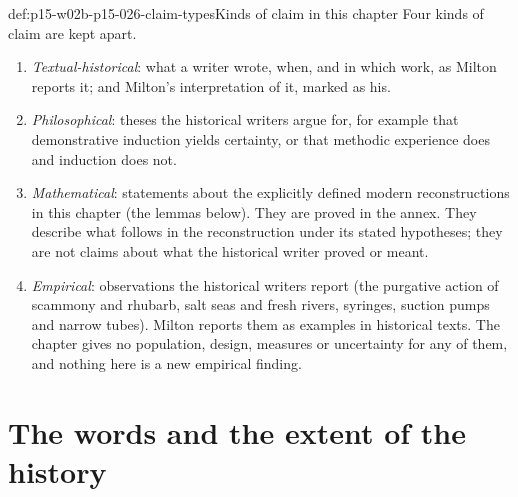 \begin{hbconvention}{def:p15-w02b-p15-026-claim-types}{Kinds of claim in this chapter}
Four kinds of claim are kept apart.
\begin{enumerate}
\item \emph{Textual-historical}: what a writer wrote, when, and in which
  work, as Milton reports it; and Milton's interpretation of it, marked as
  his.
\item \emph{Philosophical}: theses the historical writers argue for, for
  example that demonstrative induction yields certainty, or that methodic
  experience does and induction does not.
\item \emph{Mathematical}: statements about the explicitly defined modern
  reconstructions in this chapter (the lemmas below). They are proved in the
  annex. They describe what follows in the reconstruction under its stated
  hypotheses; they are not claims about what the historical writer proved or
  meant.
\item \emph{Empirical}: observations the historical writers report (the
  purgative action of scammony and rhubarb, salt seas and fresh rivers,
  syringes, suction pumps and narrow tubes). Milton reports them as examples
  in historical texts. The chapter gives no population, design, measures or
  uncertainty for any of them, and nothing here is a new empirical finding.
\end{enumerate}
\end{hbconvention}

\section{The words and the extent of the history}
\label{sec:p15-w02b-p15-026-terms}


